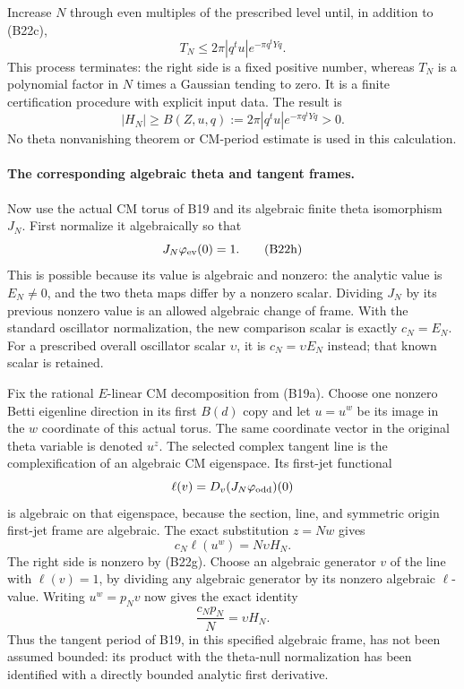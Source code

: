 \documentclass[11pt]{article}
\theoremstyle{definition}\newtheorem{definition}[theorem]{Definition}\newtheorem{remark}[theorem]{Remark}
\begin{document}
Increase $N$ through even multiples of the prescribed level
until, in addition to (B22c),
\[
                 T_N\leq
                 2\pi|q^tu|e^{-\pi q^tYq}.
 \tag{B22f}
\]
This process terminates: the right side is a fixed positive
number, whereas $T_N$ is a polynomial factor in $N$ times a
Gaussian tending to zero.  It is a finite certification
procedure with explicit input data.  The result is
\[
 |H_N|\geq B(Z,u,q):=
               2\pi|q^tu|e^{-\pi q^tYq}>0.
 \tag{B22g}
\]
No theta nonvanishing theorem or CM-period estimate is used
in this calculation.

\paragraph{The corresponding algebraic theta and tangent frames.}
Now use the actual CM torus of B19 and its algebraic finite
theta isomorphism $J_N$.
First normalize it algebraically so that
\[
                         J_N\varphi_{\rm ev}(0)=1.
 \tag{B22h}
\]
This is possible because its value is algebraic and nonzero:
the analytic value is $E_N\ne0$, and the two theta maps differ
by a nonzero scalar.  Dividing $J_N$ by its previous nonzero
value is an allowed algebraic change of frame.  With the
standard oscillator normalization, the new comparison scalar
is exactly $c_N=E_N$.  For a prescribed overall oscillator
scalar $\upsilon$, it is $c_N=\upsilon E_N$ instead; that
known scalar is retained.

Fix the rational $E$-linear CM decomposition from (B19a).
Choose one nonzero Betti eigenline direction in its first
$B(d)$ copy and let $u=u^w$ be its image in the $w$
coordinate of this actual torus.  The same coordinate vector
in the original theta variable is denoted $u^z$.
The selected complex tangent line is the complexification of
an algebraic CM eigenspace.  Its first-jet functional
\[
       \ell(v)=D_v(J_N\varphi_{\rm odd})(0)
\]
is algebraic on that eigenspace, because the section, line,
and symmetric origin first-jet frame are algebraic.
The exact substitution $z=Nw$ gives
\[
                          c_N\ell(u^w)=N\upsilon H_N.
 \tag{B22i}
\]
The right side is nonzero by (B22g).  Choose an algebraic
generator $v$ of the line with $\ell(v)=1$, by dividing any
algebraic generator by its nonzero algebraic $\ell$-value.
Writing $u^w=p_Nv$ now gives the exact identity
\[
                    \frac{c_Np_N}{N}=\upsilon H_N.
 \tag{B22j}
\]
Thus the tangent period of B19, in this specified algebraic
frame, has not been assumed bounded: its product with the
theta-null normalization has been identified with a directly
bounded analytic first derivative.
\end{document}
